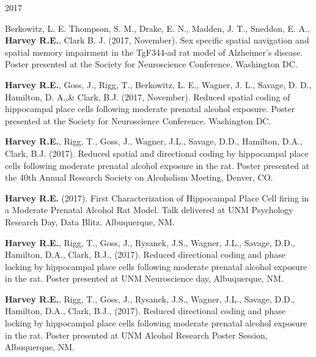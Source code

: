 \begin{cventries}
\cventry
    {} %
    {} %
    {} %
    {2017} %
    {
      \begin{cvitems} %
      \setlength\itemsep{0.4em}
        \item {Berkowitz, L. E. Thompson, S. M., Drake, E. N., Madden, J. T., Sneddon, E. A., \textbf{Harvey R.E.}, Clark B. J. (2017, November). Sex specific spatial navigation and spatial memory impairment in the TgF344-ad rat model of Alzheimer’s disease. Poster presented at the Society for Neuroscience Conference. Washington DC.}
        \item {\textbf{Harvey R.E.}, Goss, J., Rigg, T., Berkowitz, L. E., Wagner, J. L., Savage, D. D., Hamilton, D. A.,\& Clark, B.J. (2017, November). Reduced spatial coding of hippocampal place cells following moderate prenatal alcohol exposure. Poster presented at the Society for Neuroscience Conference. Washington DC.}
        \item {\textbf{Harvey R.E.}, Rigg, T., Goss, J., Wagner, J.L., Savage, D.D., Hamilton, D.A., Clark, B.J. (2017). Reduced spatial and directional coding by hippocampal place cells following moderate prenatal alcohol exposure in the rat. Poster presented at the 40th Annual Research Society on Alcoholism Meeting, Denver, CO.}
        \item {\textbf{Harvey R.E.} (2017). First Characterization of Hippocampal Place Cell firing in a Moderate Prenatal Alcohol Rat Model. Talk delivered at UNM Psychology Research Day, Data Blitz. Albuquerque, NM.}
        \item {\textbf{Harvey R.E.}, Rigg, T., Goss, J., Rysanek, J.S., Wagner, J.L., Savage, D.D., Hamilton, D.A., Clark, B.J., (2017). Reduced directional coding and phase locking by hippocampal place cells following moderate prenatal alcohol exposure in the rat. Poster presented at UNM Neuroscience day, Albuquerque, NM.}
        \item {\textbf{Harvey R.E.}, Rigg, T., Goss, J., Rysanek, J.S., Wagner, J.L., Savage, D.D., Hamilton, D.A., Clark, B.J., (2017). Reduced directional coding and phase locking by hippocampal place cells following moderate prenatal alcohol exposure in the rat. Poster presented at UNM Alcohol Research Poster Session, Albuquerque, NM.}      
      \end{cvitems}
    }
\end{cventries}

